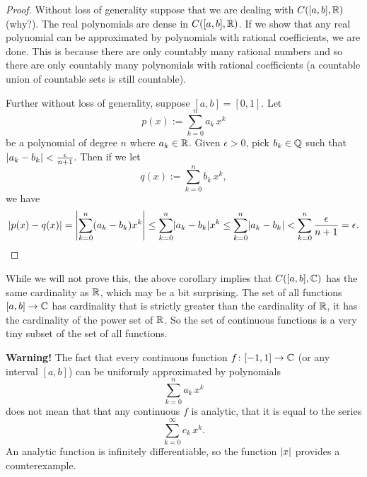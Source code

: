 \begin{proof}
Without loss of generality suppose that we are dealing with $C([a,b],{\mathbb{R}})$
(why?).
The real polynomials are dense in $C([a,b],{\mathbb{R}})$.  If we show that
any real polynomial can be approximated by polynomials with rational
coefficients, we are done.  This is because there are only countably many
rational numbers and so there are only countably many polynomials with
rational coefficients (a countable union of countable sets is still
countable).

Further without loss of generality, suppose $[a,b]=[0,1]$.  Let
\begin{equation*}
p(x) := \sum_{k=0}^n a_k\,  x^k
\end{equation*}
be a polynomial of degree $n$ where $a_k \in {\mathbb{R}}$.  Given $\epsilon > 0$, pick $b_k \in {\mathbb{Q}}$
such that $\lvert {a_k-b_k} \rvert < \frac{\epsilon}{n+1}$.  Then
if we let
\begin{equation*}
q(x) := \sum_{k=0}^n b_k \, x^k ,
\end{equation*}
we have
\begin{equation*}
\lvert {p(x)-q(x)} \rvert
=
\left\lvert {\sum_{k=0}^n (a_k-b_k) x^k} \right\rvert
\leq
\sum_{k=0}^n \lvert {a_k-b_k} \rvert x^k
\leq
\sum_{k=0}^n \lvert {a_k-b_k} \rvert
<
\sum_{k=0}^n \frac{\epsilon}{n+1} = \epsilon . \qedhere
\end{equation*}
\end{proof}

\begin{remark}
While we will not prove this, the above corollary implies that
$C([a,b],{\mathbb{C}})$ has the same cardinality as ${\mathbb{R}}$, which may be a
bit surprising.  The set of all functions $[a,b] \to {\mathbb{C}}$ has
cardinality that is strictly greater than the cardinality of ${\mathbb{R}}$, it has the
cardinality of the power set of ${\mathbb{R}}$.  So the
set of continuous functions is a very tiny subset of the set of all
functions.
\end{remark}

\textbf{Warning!}
The fact that every continuous function $f \colon [-1,1] \to {\mathbb{C}}$ (or any
interval $[a,b]$) can be uniformly
approximated by polynomials
\begin{equation*}
\sum_{k=0}^n a_k\,  x^k
\end{equation*}
does not mean that that any continuous $f$ is analytic, that it is equal to the
series
\begin{equation*}
\sum_{k=0}^\infty c_k\,  x^k .
\end{equation*}
An analytic function is infinitely differentiable, so the function
$\lvert {x} \rvert$ provides a counterexample.

